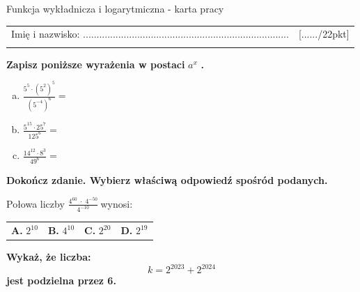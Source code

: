 \documentclass[12pt,a4paper]{article}
\theoremstyle{break}
\begin{document}
	
	\begin{center}
		\LARGE Funkcja wykładnicza i logarytmiczna - karta pracy
	\end{center}
	
	\begin{tabular}{p{13cm} r}
		Imię i nazwisko: ............................................................................
		&[....../22pkt]\\ 
		\vspace{0.5cm}
	\end{tabular}
	
	\begin{zad}[0-3]
		\textbf{Zapisz poniższe wyrażenia w postaci} $a^x$ \textbf{.}
	\end{zad} 
	
	\begin{enumerate}[a)]\Large
		\item $\frac{5^5\cdot(5^2)^5}{(5^{-4})^6}=$
		\item $\frac{5^{15}\cdot25^7}{125^6}=$
		\item $\frac{14^{12}\cdot8^3}{49^6}=$
	\end{enumerate}
	
	
	\begin{zad}[0-1]
		\textbf{Dokończ zdanie. Wybierz właściwą odpowiedź spośród podanych.}
	\end{zad} 
	
	Połowa liczby \Large$\frac{4^{60}\;\cdot\;4^{-50}}{4^{-10}}\:$\normalsize wynosi:
	
	\vspace{0.5cm}
	\begin{tabular}{p{3.5cm} p{3.5cm} p{3.5cm} p{3.5cm}}
		\textbf{A. }$2^{10}$&
		\textbf{B. }$4^{10}$&
		\textbf{C. }$2^{20}$&
		\textbf{D. }$2^{19}$\\
	\end{tabular}
	
	
	\begin{zad}[0-3]
		\textbf{Wykaż, że liczba:}
		$$k=2^{2023}+2^{2024}$$
		\textbf{jest podzielna przez 6.}
	\end{zad} 
	
\end{document}
